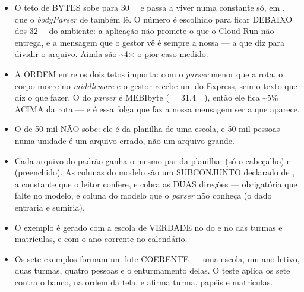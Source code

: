 \begin{itemize}
  \item O teto de BYTES sobe para \SI{30}{\mega\byte} e passa a viver numa
    constante só,  em , que o
    \emph{bodyParser} de  também lê. O número é escolhido para
    ficar DEBAIXO dos \SI{32}{\mebi\byte} do ambiente: a aplicação não promete
    o que o Cloud Run não entrega, e a mensagem que o gestor vê é sempre a nossa
    --- a que diz para dividir o arquivo. Ainda são
    \textasciitilde4$\times$ o pior caso medido.
  \item A ORDEM entre os dois tetos importa: com o \emph{parser} menor que a
    rota, o corpo morre no \emph{middleware} e o gestor recebe um
     do Express, sem o texto que diz o que fazer. O
     do \emph{parser} é MEBIbyte ( = \SI{31.4}{\mega\byte}),
    então ele fica \textasciitilde5\% ACIMA da rota --- e é essa folga que faz
    a nossa mensagem ser a que aparece.
  \item O  de 50 mil NÃO sobe: ele é da planilha de uma escola,
    e 50 mil pessoas numa unidade é um arquivo errado, não um arquivo grande.
  \item Cada arquivo do padrão ganha o mesmo par da planilha:
     (só o cabeçalho) e
     (preenchido). As colunas do modelo são um
    SUBCONJUNTO declarado de , a constante que o leitor
    confere, e  cobra as DUAS direções ---
    obrigatória que falte no modelo, e coluna do modelo que o \emph{parser} não
    conheça (o dado entraria e sumiria).
  \item O exemplo é gerado com a escola de VERDADE no  do
     e no  das turmas e matrículas, e com o ano
    corrente no calendário.
  \item Os sete exemplos formam um lote COERENTE --- uma escola, um ano letivo,
    duas turmas, quatro pessoas e o enturmamento delas. O teste aplica os sete
    contra o banco, na ordem da tela, e afirma turma, papéis e matrículas.
\end{itemize}

